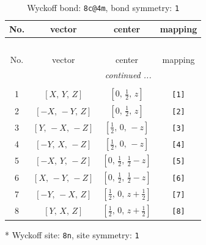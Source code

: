 \documentclass[fleqn,8pt]{jsarticle}
\begin{document}
\renewcommand{\arraystretch}{1.2}
\begin{longtable}{cccc}
\caption{Wyckoff bond: {\tt 8c@4m}, bond symmetry: {\tt 1}}
 \\
 \hline \hline
No. & vector & center & mapping \\ \hline \endfirsthead

\multicolumn{3}{l}{\tablename\ \thetable{}} \\
 \hline \hline
No. & vector & center & mapping \\ \hline \endhead

 \hline \hline
\multicolumn{3}{r}{\footnotesize\it continued ...} \\ \endfoot

 \hline \hline
\multicolumn{3}{r}{} \\ \endlastfoot

1 & $\left[ X,\, Y,\, Z \right]$ & $\left[ 0,\, \frac{1}{2},\, z \right]$ & {\tt [1]} \\ \hline
2 & $\left[ - X,\, - Y,\, Z \right]$ & $\left[ 0,\, \frac{1}{2},\, z \right]$ & {\tt [2]} \\ \hline
3 & $\left[ Y,\, - X,\, - Z \right]$ & $\left[ \frac{1}{2},\, 0,\, - z \right]$ & {\tt [3]} \\ \hline
4 & $\left[ - Y,\, X,\, - Z \right]$ & $\left[ \frac{1}{2},\, 0,\, - z \right]$ & {\tt [4]} \\ \hline
5 & $\left[ - X,\, Y,\, - Z \right]$ & $\left[ 0,\, \frac{1}{2},\, \frac{1}{2} - z \right]$ & {\tt [5]} \\ \hline
6 & $\left[ X,\, - Y,\, - Z \right]$ & $\left[ 0,\, \frac{1}{2},\, \frac{1}{2} - z \right]$ & {\tt [6]} \\ \hline
7 & $\left[ - Y,\, - X,\, Z \right]$ & $\left[ \frac{1}{2},\, 0,\, z + \frac{1}{2} \right]$ & {\tt [7]} \\ \hline
8 & $\left[ Y,\, X,\, Z \right]$ & $\left[ \frac{1}{2},\, 0,\, z + \frac{1}{2} \right]$ & {\tt [8]} \\
\end{longtable}
* Wyckoff site: {\tt 8n}, site symmetry: {\tt 1}
\renewcommand{\arraystretch}{1.2}
\end{document}
